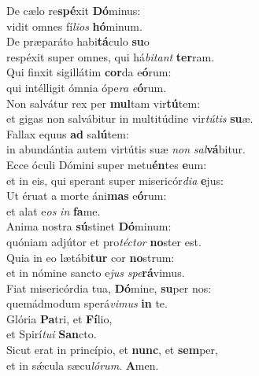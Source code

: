 \oddverse De cælo re\textbf{spé}xit \textbf{Dó}minus:~\*\\
\oddverse vidit omnes fí\textit{li}\textit{os} \textbf{hó}minum.\\
\evenverse De præparáto habi\textbf{tá}culo \textbf{su}o~\*\\
\evenverse respéxit super omnes, qui há\textit{bi}\textit{tant} \textbf{ter}ram.\\
\oddverse Qui finxit sigillátim \textbf{cor}da e\textbf{ó}rum:~\*\\
\oddverse qui intélligit ómnia ópe\textit{ra} \textit{e}\textbf{ó}rum.\\
\evenverse Non salvátur rex per \textbf{mul}tam vir\textbf{tú}tem:~\*\\
\evenverse et gigas non salvábitur in multitúdine vir\textit{tú}\textit{tis} \textbf{su}æ.\\
\oddverse Fallax equus \textbf{ad} sa\textbf{lú}tem:~\*\\
\oddverse in abundántia autem virtútis suæ \textit{non} \textit{sal}\textbf{vá}bitur.\\
\evenverse Ecce óculi Dómini super metu\textbf{én}tes \textbf{e}um:~\*\\
\evenverse et in eis, qui sperant super misericór\textit{di}\textit{a} \textbf{e}jus:\\
\oddverse Ut éruat a morte áni\textbf{mas} e\textbf{ó}rum:~\*\\
\oddverse et alat e\textit{os} \textit{in} \textbf{fa}me.\\
\evenverse Anima nostra \textbf{sú}stinet \textbf{Dó}minum:~\*\\
\evenverse quóniam adjútor et pro\textit{té}\textit{ctor} \textbf{no}ster est.\\
\oddverse Quia in eo lætábi\textbf{tur} cor \textbf{no}strum:~\*\\
\oddverse et in nómine sancto e\textit{jus} \textit{spe}\textbf{rá}vimus.\\
\evenverse Fiat misericórdia tua, \textbf{Dó}mine, \textbf{su}per nos:~\*\\
\evenverse quemádmodum sperá\textit{vi}\textit{mus} \textbf{in} te.\\
\oddverse Glória \textbf{Pa}tri, et \textbf{Fí}lio,~\*\\
\oddverse et Spirí\textit{tu}\textit{i} \textbf{San}cto.\\
\evenverse Sicut erat in princípio, et \textbf{nunc}, et \textbf{sem}per,~\*\\
\evenverse et in sǽcula sæcu\textit{ló}\textit{rum}. \textbf{A}men.\\
